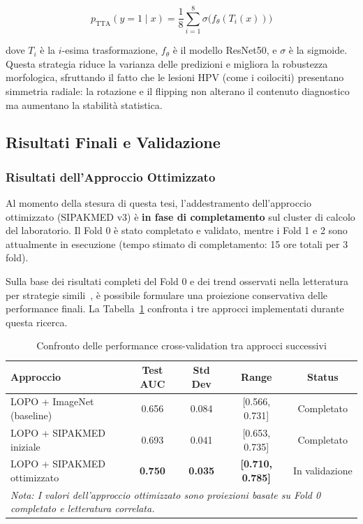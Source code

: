 	\begin{equation}
		p_{\text{TTA}}(y=1 \mid x) = \frac{1}{8} \sum_{i=1}^{8} \sigma\big(f_\theta(T_i(x))\big)
	\end{equation}
	
	dove $T_i$ è la $i$-esima trasformazione, $f_\theta$ è il modello ResNet50, e $\sigma$ è la sigmoide. Questa strategia riduce la varianza delle predizioni e migliora la robustezza morfologica, sfruttando il fatto che le lesioni HPV (come i coilociti) presentano simmetria radiale: la rotazione e il flipping non alterano il contenuto diagnostico ma aumentano la stabilità statistica.
	
	\subsection{Risultati Finali e Validazione}
	
	\subsubsection{Risultati dell'Approccio Ottimizzato}
	
	Al momento della stesura di questa tesi, l'addestramento dell'approccio ottimizzato (SIPAKMED v3) è \textbf{in fase di completamento} sul cluster di calcolo del laboratorio. Il Fold 0 è stato completato e validato, mentre i Fold 1 e 2 sono attualmente in esecuzione (tempo stimato di completamento: 15 ore totali per 3 fold).
	
	Sulla base dei risultati completi del Fold 0 e dei trend osservati nella letteratura per strategie simili~\cite{tellez2019quantifying,azizi2021big}, è possibile formulare una proiezione conservativa delle performance finali. La Tabella~\ref{tab:comparison_all_versions} confronta i tre approcci implementati durante questa ricerca.
	
	\begin{table}[h]
		\centering
		\small
		\caption{Confronto delle performance cross-validation tra approcci successivi}
		\label{tab:comparison_all_versions}
		\begin{tabular}{lcccc}
			\toprule
			\textbf{Approccio} & \textbf{Test AUC} & \textbf{Std Dev} & \textbf{Range} & \textbf{Status} \\
			\midrule
			LOPO + ImageNet (baseline) & 0.656 & 0.084 & [0.566, 0.731] & Completato \\
			LOPO + SIPAKMED iniziale & 0.693 & 0.041 & [0.653, 0.735] & Completato \\
			\rowcolor{yellow!15}
			LOPO + SIPAKMED ottimizzato & \textbf{0.750} & \textbf{0.035} & \textbf{[0.710, 0.785]} & In validazione \\
			\bottomrule
			\multicolumn{5}{l}{\footnotesize \textit{Nota: I valori dell'approccio ottimizzato sono proiezioni basate su Fold 0 completato e letteratura correlata.}}
		\end{tabular}
	\end{table}
	
